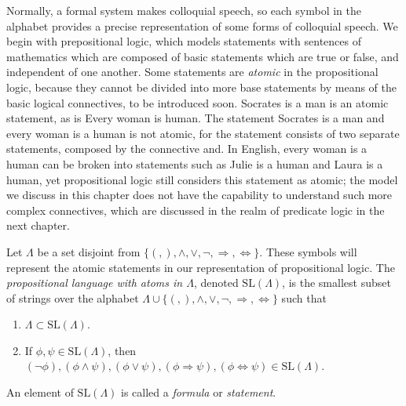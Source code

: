 Normally, a formal system makes colloquial speech, so each symbol in the alphabet provides a precise representation of some forms of colloquial speech. We begin with prepositional logic, which models statements with sentences of mathematics which are composed of basic statements which are true or false, and independent of one another. Some statements are \emph{atomic} in the propositional logic, because they cannot be divided into more base statements by means of the basic logical connectives, to be introduced soon. \textsf{Socrates is a man} is an atomic statement, as is \textsf{Every woman is human}. The statement \textsf{Socrates is a man and every woman is a human} is not atomic, for the statement consists of two separate statements, composed by the connective \textsf{and}. In English, \textsf{every woman is a human} can be broken into statements such as \textsf{Julie is a human} and \textsf{Laura is a human}, yet propositional logic still considers this statement as atomic; the model we discuss in this chapter does not have the capability to understand such more complex connectives, which are discussed in the realm of predicate logic in the next chapter.

Let $\Lambda$ be a set disjoint from $\{ (, ), \wedge, \vee, \neg, \Rightarrow, \Leftrightarrow \}$. These symbols will represent the atomic statements in our representation of propositional logic. The \emph{propositional language with atoms in $\Lambda$}, denoted $\text{SL}(\Lambda)$, is the smallest subset of strings over the alphabet $\Lambda \cup \{ (, ), \wedge, \vee, \neg, \Rightarrow, \Leftrightarrow \}$ such that
%
\begin{enumerate}
    \item $\Lambda \subset \text{SL}(\Lambda)$.
    \item If $\phi, \psi \in \text{SL}(\Lambda)$, then $(\neg \phi), (\phi \wedge \psi), (\phi \vee \psi), (\phi \Rightarrow \psi), (\phi \Leftrightarrow \psi) \in \text{SL}(\Lambda)$.
\end{enumerate}
%
An element of $\text{SL}(\Lambda)$ is called a \emph{formula} or \emph{statement}.

